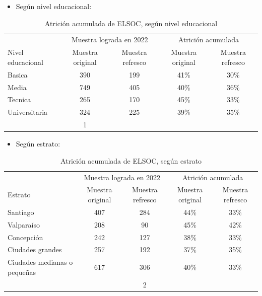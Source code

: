 \documentclass[
  12pt,
]{book}
\providecommand{\tightlist}{%
  \setlength{\itemsep}{0pt}\setlength{\parskip}{0pt}}
\begin{document}
\begin{itemize}
\tightlist
\item
  Según nivel educacional:
\end{itemize}

\begin{table}

\caption{\label{tab:tabla-atricion-educ}Atrición acumulada de ELSOC, según nivel educacional}
\centering
\begin{tabular}[t]{l|c|c|c|c}
\hline
\multicolumn{1}{c|}{ } & \multicolumn{2}{c|}{Muestra lograda en 2022} & \multicolumn{2}{c}{Atrición acumulada} \\
\cline{2-3} \cline{4-5}
Nivel educacional & Muestra original & Muestra refresco & Muestra original & Muestra refresco\\
\hline
Basica & 390 & 199 & 41\% & 30\%\\
\hline
Media & 749 & 405 & 40\% & 36\%\\
\hline
Tecnica & 265 & 170 & 45\% & 33\%\\
\hline
Universitaria & 324 & 225 & 39\% & 35\%\\
\hline
 & 1 &  &  & \\
\hline
\end{tabular}
\end{table}

\begin{itemize}
\tightlist
\item
  Según estrato:
\end{itemize}

\begin{table}

\caption{\label{tab:tabla-atricion-estrato}Atrición acumulada de ELSOC, según estrato}
\centering
\begin{tabular}[t]{l|c|c|c|c}
\hline
\multicolumn{1}{c|}{ } & \multicolumn{2}{c|}{Muestra lograda en 2022} & \multicolumn{2}{c}{Atrición acumulada} \\
\cline{2-3} \cline{4-5}
Estrato & Muestra original & Muestra refresco & Muestra original & Muestra refresco\\
\hline
Santiago & 407 & 284 & 44\% & 33\%\\
\hline
Valparaíso & 208 & 90 & 45\% & 42\%\\
\hline
Concepción & 242 & 127 & 38\% & 33\%\\
\hline
Ciudades
grandes & 257 & 192 & 37\% & 35\%\\
\hline
Ciudades medianas
o pequeñas & 617 & 306 & 40\% & 33\%\\
\hline
 &  & 2 &  & \\
\hline
\end{tabular}
\end{table}
\end{document}
